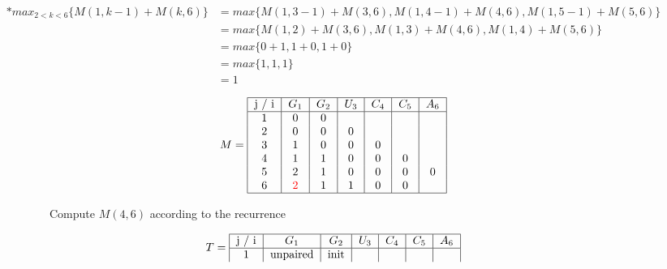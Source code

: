 \begin{align*}
    *   max_{2 < k < 6} \{ M (1, k - 1) + M (k, 6) \} & = max\{
    M (1,3-1 ) + M (3, 6) ,
    M (1,4-1 ) + M (4, 6) ,
    M (1,5-1 ) + M (5, 6)
    \} \\
    & =  max\{
    M (1,2 ) + M (3, 6) ,
    M (1,3 ) + M (4, 6) ,
    M (1,4 ) + M (5, 6)
    \} \\
    & =  max\{
    0 + 1,
    1 + 0,
    1 + 0
    \}  \\
    & = max \{
    1,
    1 ,
    1
    \}  \\
    & = 1
\end{align*}



\begin{figure}[H]
    \centering
    \begin{subfigure}[t]{0.25\textwidth}
        \scriptsize
        \[
            M =  \begin{tabular}{|c|c|c|c|c|c|c|}
                     \hline
                     j / i & $G_1$              & $G_2$ & $U_3$ & $C_4$ & $C_5$ & $A_6$ \\ \hline
                     1     & 0                  & 0     &       &       &       &       \\
                     2     & 0                  & 0     & 0     &       &       &       \\
                     3     & 1                  & 0     & 0     & 0     &       &       \\
                     4     & 1                  & 1     & 0     & 0     & 0     &       \\
                     5     & 2                  & 1     & 0     & 0     & 0     & 0     \\
                     6     & \textcolor{red}{2} & 1     & 1     & 0     & 0     &       \\ \hline
            \end{tabular}
        \]
        \caption{ Compute $M(4,6)$ according to the recurrence}
    \end{subfigure}
    \hfill
    \begin{subfigure}[t]{0.65\textwidth}
        \scriptsize
        \[
            T =     \begin{tabular}{|c|c|c|c|c|c|c|}
                        \hline
                        j / i & $G_1$                   & $G_2$    & $U_3$    & $C_4$    & $C_5$    & $A_6$                   \\ \hline
                        1     & unpaired                & init     &          &          &          &                         \\

\end{tabular}\]
\end{subfigure}
\end{figure}
